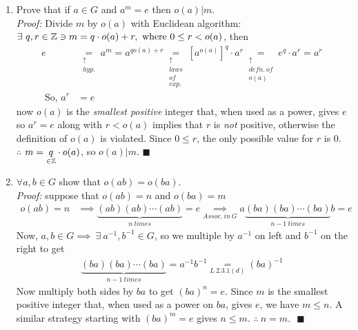 \begin{enumerate}
    \item Prove that if $a\in G$ and $a^m=e$ then $o(a)|m$. \\
    \textit{Proof: } Divide $m$ by $o(a)$ with Euclidean algorithm: $\exists \ q,r \in {\mathbb{Z}} \ni m = q\cdot o(a)+r, \text{ where } 0\leq r < o(a)$, then
    \begin{align*}
        e &\underset{\substack{\uparrow \\ hyp.}}{=} a^m 
        = a^{qo(a)+r} 
        \underset{\substack{\uparrow \\ laws \\ of \\ exp.}}{=} [a^{o(a)}]^{q} \cdot a^r
        \underset{\substack{\uparrow \\ defn. \ of \\ o(a)}}{=} e^q\cdot a^r 
        =a^r  \\ 
        \text{ So, } a^r &= e
    \end{align*}
    now $o(a)$ is the \textit{smallest positive} integer that, when used as a power, gives $e$ so $a^r=e$ along with $r<o(a)$ implies that $r$ is \textit{not} positive, otherwise the definition of $o(a)$ is violated. Since $0\leq r $, the only possible value for $r$ is $0$. \\
    $\therefore$ $m=\underset{\in {\mathbb{Z}}}{q}\cdot o(a)$, so $o(a)|m$. $\blacksquare$ 

    \item $\forall a,b \in G$ show that $o(ab)=o(ba)$. \\
\textit{Proof:} suppose that $o(ab)=n$ and $o(ba)=m$ \\
\begin{align*}
    o(ab)=n &\implies \underbrace{(ab)(ab) \cdots (ab)}_{n \ times} = e \underset{Assoc. \ in \ G}{\implies} a\underbrace{(ba)(ba) \cdots (ba)}_{n-1 \ times}b = e 
\end{align*} 
Now, $a,b \in G \implies \ \exists \ a^{-1}, b^{-1}\in G$, so we multiple by $a^{-1}$ on left and $b^{-1}$ on the right to get
\begin{align*}
    \underbrace{(ba)(ba)\cdots (ba)}_{n-1 \ times} = a^{-1}b^{-1} \underset{L \ 2.3.1(d)}{=} (ba)^{-1}
\end{align*}
Now multiply both sides by $ba$ to get
$(ba)^n=e$. Since $m$ is the smallest positive integer that, when used as a power on $ba$, gives $e$, we have $m\leq n$. A similar strategy starting with $(ba)^m = e$ gives $n\leq m$. 
$\therefore \ n=m. \ \ \ \blacksquare$ 


\end{enumerate}
